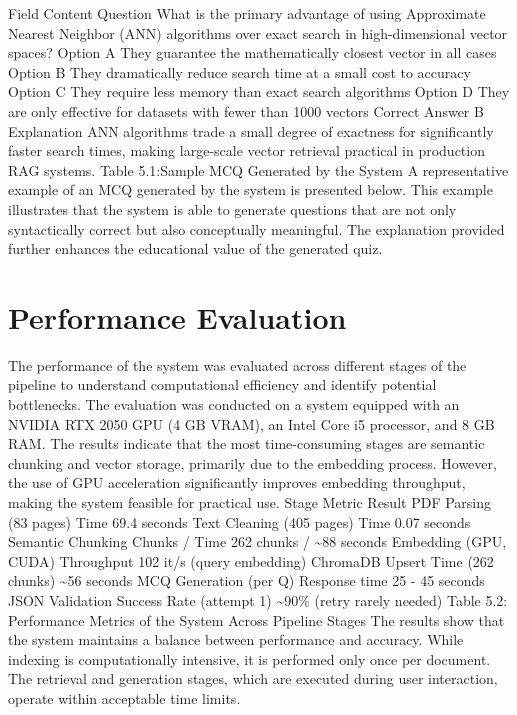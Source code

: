 \documentclass[12pt,a4paper]{report}
\begin{document}
Field
Content
Question
What is the primary advantage of using Approximate Nearest Neighbor (ANN) algorithms over exact search in high-dimensional vector spaces?
Option A
They guarantee the mathematically closest vector in all cases
Option B
They dramatically reduce search time at a small cost to accuracy
Option C
They require less memory than exact search algorithms
Option D
They are only effective for datasets with fewer than 1000 vectors
Correct Answer
B
Explanation
ANN algorithms trade a small degree of exactness for significantly faster search times, making large-scale vector retrieval practical in production RAG systems.
Table 5.1:Sample MCQ Generated by the System
A representative example of an MCQ generated by the system is presented below. This example illustrates that the system is able to generate questions that are not only syntactically correct but also conceptually meaningful. The explanation provided further enhances the educational value of the generated quiz.
\section{Performance Evaluation}
The performance of the system was evaluated across different stages of the pipeline to understand computational efficiency and identify potential bottlenecks. The evaluation was conducted on a system equipped with an NVIDIA RTX 2050 GPU (4 GB VRAM), an Intel Core i5 processor, and 8 GB RAM.
The results indicate that the most time-consuming stages are semantic chunking and vector storage, primarily due to the embedding process. However, the use of GPU acceleration significantly improves embedding throughput, making the system feasible for practical use.
Stage
Metric
Result
PDF Parsing (83 pages)
Time
69.4 seconds
Text Cleaning (405 pages)
Time
0.07 seconds
Semantic Chunking
Chunks / Time
262 chunks / \~{}88 seconds
Embedding (GPU, CUDA)
Throughput
102 it/s (query embedding)
ChromaDB Upsert
Time (262 chunks)
\~{}56 seconds
MCQ Generation (per Q)
Response time
25 - 45 seconds
JSON Validation Success
Rate (attempt 1)
\~{}90\% (retry rarely needed)
Table 5.2: Performance Metrics of the System Across Pipeline Stages
The results show that the system maintains a balance between performance and accuracy. While indexing is computationally intensive, it is performed only once per document. The retrieval and generation stages, which are executed during user interaction, operate within acceptable time limits.
\end{document}
